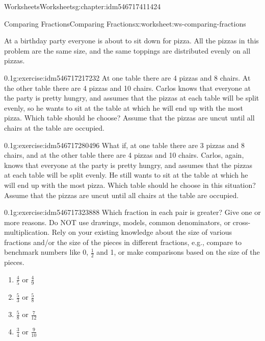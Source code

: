 \documentclass[twoside,11pt,]{book}
\begin{document}
\begin{chapterptx}{Worksheets}{}{Worksheets}{}{}{g:chapter:idm546717411424}
\begin{worksheet-section-numberless}{Comparing Fractions}{}{Comparing Fractions}{}{}{x:worksheet:ws-comparing-fractions}
\begin{introduction}{}%
At a birthday party everyone is about to sit down for pizza.  All the pizzas in this problem are the same size, and the same toppings are distributed evenly on all pizzas.%
\end{introduction}%
\begin{divisionexercise}{1}{}{0.1}{g:exercise:idm546717217232}%
At one table there are 4 pizzas and 8 chairs.  At the other table there are 4 pizzas and 10 chairs.  Carlos knows that everyone at the party is pretty hungry, and assumes that the pizzas at each table will be split evenly, so he wants to sit at the table at which he will end up with the most pizza.  Which table should he choose?  Assume that the pizzas are uncut until all chairs at the table are occupied.%
\end{divisionexercise}%
\begin{divisionexercise}{2}{}{0.1}{g:exercise:idm546717280496}%
What if, at one table there are 3 pizzas and 8 chairs, and at the other table there are 4 pizzas and 10 chairs.  Carlos, again, knows that everyone at the party is pretty hungry, and assumes that the pizzas at each table will be split evenly.  He still wants to sit at the table at which he will end up with the most pizza.  Which table should he choose in this situation? Assume that the pizzas are uncut until all chairs at the table are occupied.%
\end{divisionexercise}%
\begin{divisionexercise}{3}{}{0.1}{g:exercise:idm546717323888}%
Which fraction in each pair is greater?  Give one or more reasons.  Do NOT use drawings, models, common denominators, or cross-multiplication.  Rely on your existing knowledge about the size of various fractions and\slash{}or the size of the pieces in different fractions, e.g., compare to benchmark numbers like 0, \(\frac{1}{2} \) and 1, or make comparisons based on the size of the pieces.%
%
\begin{enumerate}[label=(\alph*)]
\item{}\(\frac{4}{5} \) or \(\frac{4}{9} \)%
\item{}\(\frac{5}{3} \) or \(\frac{5}{8} \)%
\item{}\(\frac{5}{8} \) or \(\frac{7}{12} \)%
\item{}\(\frac{3}{4} \) or \(\frac{9}{10} \)%
\end{enumerate}

\end{divisionexercise}
\end{worksheet-section-numberless}
\end{chapterptx}
\end{document}
